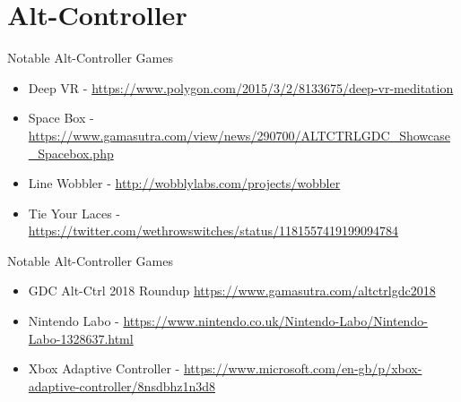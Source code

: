 \part{Alt-Controller}
\frame{\partpage}

\begin{frame}{Notable Alt-Controller Games}
\begin{itemize}
	\item Deep VR - \url{https://www.polygon.com/2015/3/2/8133675/deep-vr-meditation}
	\item Space Box - \url{https://www.gamasutra.com/view/news/290700/ALTCTRLGDC_Showcase_Spacebox.php}
	\item Line Wobbler - \url{http://wobblylabs.com/projects/wobbler}
	\item Tie Your Laces - \url{https://twitter.com/wethrowswitches/status/1181557419199094784}
\end{itemize}
\end{frame}


\begin{frame}{Notable Alt-Controller Games}
\begin{itemize}
	\item GDC Alt-Ctrl 2018 Roundup \url{https://www.gamasutra.com/altctrlgdc2018}
	\item Nintendo Labo - \url{https://www.nintendo.co.uk/Nintendo-Labo/Nintendo-Labo-1328637.html}
	\item Xbox Adaptive Controller - 
	\url{https://www.microsoft.com/en-gb/p/xbox-adaptive-controller/8nsdbhz1n3d8}
\end{itemize}
\end{frame}

